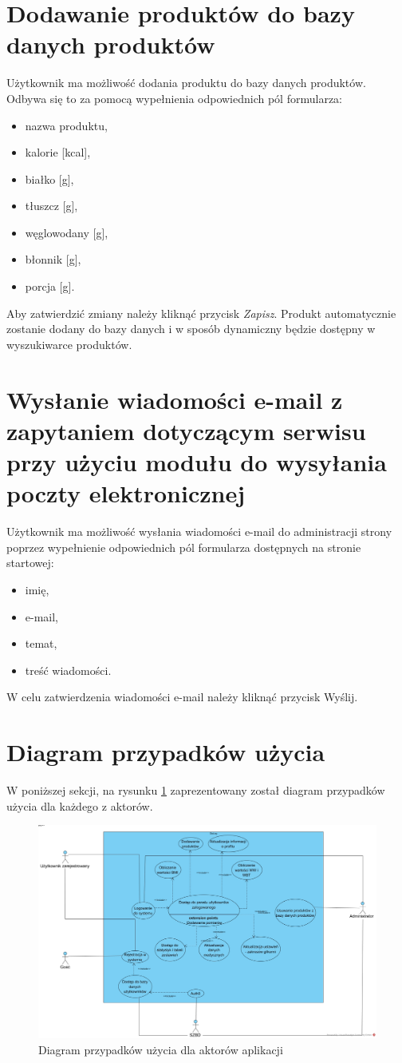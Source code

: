 \section{Dodawanie produktów do bazy danych produktów}
Użytkownik ma możliwość dodania produktu do bazy danych produktów. Odbywa się to za pomocą wypełnienia odpowiednich pól formularza:
\begin{itemize}
	\item nazwa produktu,
	\item kalorie [kcal],
	\item białko [g],
	\item tłuszcz [g],
	\item węglowodany [g],
	\item błonnik [g],
	\item porcja [g].
\end{itemize}
Aby zatwierdzić zmiany należy kliknąć przycisk \textit{Zapisz}. Produkt automatycznie zostanie dodany do bazy danych i w sposób dynamiczny będzie dostępny w wyszukiwarce produktów. 

\section{Wysłanie wiadomości e-mail z zapytaniem dotyczącym serwisu przy użyciu modułu do wysyłania poczty elektronicznej}
Użytkownik ma możliwość wysłania wiadomości e-mail do administracji strony poprzez wypełnienie odpowiednich pól formularza dostępnych na stronie startowej:
\begin{itemize}
	\item imię,
	\item e-mail,
	\item temat,
	\item treść wiadomości.
\end{itemize}
W celu zatwierdzenia wiadomości e-mail należy kliknąć przycisk Wyślij. 

\section{Diagram przypadków użycia}
W poniższej sekcji, na rysunku \ref{Rys:useCaseDiagram} zaprezentowany został diagram przypadków użycia dla każdego z aktorów.

\begin{figure}[h]
	\centering\includegraphics[angle=90, scale=0.4]{images/use_case_diagram.jpg}
	\caption{Diagram przypadków użycia dla aktorów aplikacji}
	\label{Rys:useCaseDiagram}
\end{figure}
